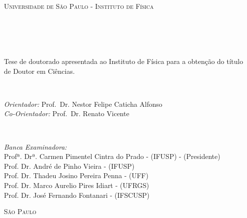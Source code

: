 \begin{titlepage}
\begin{fullwidth}
\begin{center}


\textsc{\LARGE Universidade de São Paulo - Instituto de Física}\\[2cm]

\HRule \\[0.2cm]
\textsc{\textit{\titlefont {\titletext:}\\[0.0cm] \subtitlefont {\subtitletext}}}
\HRule\\[1.2cm]
\textsc{\LARGE \authorinfo }\\[1.cm]
\hfill\begin{minipage}{0.7\textwidth}
\Large
Tese de doutorado apresentada ao Instituto de Física para a obtenção do título de Doutor em Ciências. 
\end{minipage}\\[1.cm]
\hfill\begin{minipage}{0.9\textwidth}
\Large

\emph{Orientador:} Prof.~Dr. Nestor Felipe Caticha Alfonso\\

\emph{Co-Orientador:} Prof.~Dr. Renato Vicente
\end{minipage}\\[1.5cm]
\begin{minipage}[l]{1.5\textwidth}
\Large\vfill
\qquad\textit{Banca Examinadora:}\\
Profª. Drª. Carmen Pimentel Cintra do Prado - (IFUSP) - (Presidente)\\
Prof. Dr. André de Pinho Vieira - (IFUSP)\\
Prof. Dr. Thadeu Josino Pereira Penna - (UFF)\\
Prof. Dr. Marco Aurelio Pires Idiart - (UFRGS)\\
Prof. Dr. José Fernando Fontanari - (IFSCUSP)
\end{minipage}

\vfill

\textsc{\LARGE São Paulo}\\
\textsc{\LARGE \the\year}

\end{center}
\end{fullwidth}
\end{titlepage}
